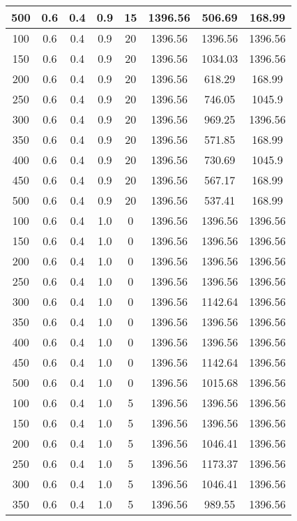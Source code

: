 \documentclass[a4paper, 12pt]{extreport}
\begin{document}
\begin{itemize}
\begin{longtable}{|c|c|c|c|c|c|c|c|}
			500 & 0.6 & 0.4 & 0.9 & 15 & 1396.56 & 506.69 & 168.99 \\\hline
			100 & 0.6 & 0.4 & 0.9 & 20 & 1396.56 & 1396.56 & 1396.56 \\\hline
			150 & 0.6 & 0.4 & 0.9 & 20 & 1396.56 & 1034.03 & 1396.56 \\\hline
			200 & 0.6 & 0.4 & 0.9 & 20 & 1396.56 & 618.29 & 168.99 \\\hline
			250 & 0.6 & 0.4 & 0.9 & 20 & 1396.56 & 746.05 & 1045.9 \\\hline
			300 & 0.6 & 0.4 & 0.9 & 20 & 1396.56 & 969.25 & 1396.56 \\\hline
			350 & 0.6 & 0.4 & 0.9 & 20 & 1396.56 & 571.85 & 168.99 \\\hline
			400 & 0.6 & 0.4 & 0.9 & 20 & 1396.56 & 730.69 & 1045.9 \\\hline
			450 & 0.6 & 0.4 & 0.9 & 20 & 1396.56 & 567.17 & 168.99 \\\hline
			500 & 0.6 & 0.4 & 0.9 & 20 & 1396.56 & 537.41 & 168.99 \\\hline
			100 & 0.6 & 0.4 & 1.0 & 0 & 1396.56 & 1396.56 & 1396.56 \\\hline
			150 & 0.6 & 0.4 & 1.0 & 0 & 1396.56 & 1396.56 & 1396.56 \\\hline
			200 & 0.6 & 0.4 & 1.0 & 0 & 1396.56 & 1396.56 & 1396.56 \\\hline
			250 & 0.6 & 0.4 & 1.0 & 0 & 1396.56 & 1396.56 & 1396.56 \\\hline
			300 & 0.6 & 0.4 & 1.0 & 0 & 1396.56 & 1142.64 & 1396.56 \\\hline
			350 & 0.6 & 0.4 & 1.0 & 0 & 1396.56 & 1396.56 & 1396.56 \\\hline
			400 & 0.6 & 0.4 & 1.0 & 0 & 1396.56 & 1396.56 & 1396.56 \\\hline
			450 & 0.6 & 0.4 & 1.0 & 0 & 1396.56 & 1142.64 & 1396.56 \\\hline
			500 & 0.6 & 0.4 & 1.0 & 0 & 1396.56 & 1015.68 & 1396.56 \\\hline
			100 & 0.6 & 0.4 & 1.0 & 5 & 1396.56 & 1396.56 & 1396.56 \\\hline
			150 & 0.6 & 0.4 & 1.0 & 5 & 1396.56 & 1396.56 & 1396.56 \\\hline
			200 & 0.6 & 0.4 & 1.0 & 5 & 1396.56 & 1046.41 & 1396.56 \\\hline
			250 & 0.6 & 0.4 & 1.0 & 5 & 1396.56 & 1173.37 & 1396.56 \\\hline
			300 & 0.6 & 0.4 & 1.0 & 5 & 1396.56 & 1046.41 & 1396.56 \\\hline
			350 & 0.6 & 0.4 & 1.0 & 5 & 1396.56 & 989.55 & 1396.56 \\\hline

\end{longtable}
\end{itemize}
\end{document}
